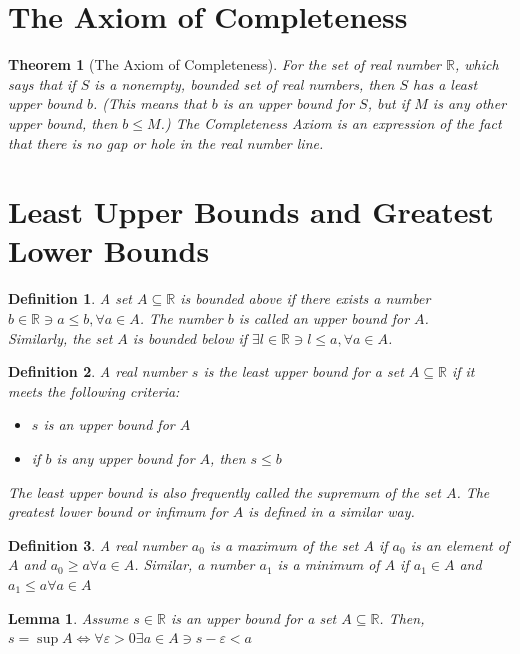 \documentclass[10pt]{report}
\newtheorem{thm2}{Theorem}[section]
\newtheorem{lem2}{Lemma}[section]
\newtheorem{def2}{Definition}[section]
\newcommand{\eps}{\varepsilon}
\begin{document}
\section{The Axiom of Completeness}
\begin{thm2}[The Axiom of Completeness]
For the set of real number $\mathbb{R}$, which says that if $S$ is a nonempty, bounded set of real numbers, then $S$ has a least upper bound $b$. (This means that $b$ is an upper bound for $S$, but if $M$ is any other upper bound, then $b\leq M$.) The Completeness Axiom is an expression of the fact that there is no gap or hole in the real number line.
\end{thm2}

\section{Least Upper Bounds and Greatest Lower Bounds}
\begin{def2}
A set $A\subseteq \mathbb{R}$ is bounded above if there exists a number $b\in \mathbb{R}\ni a\leq b,\forall a\in A$. The number $b$ is called an upper bound for $A$.\\
Similarly, the set $A$ is bounded below if $\exists l\in \mathbb{R}\ni l\leq a,\forall a\in A$. 
\end{def2}
\begin{def2}
A real number $s$ is the least upper bound for a set $A\subseteq \mathbb{R}$ if it meets the following criteria:
\begin{itemize}
\item[(1)] $s$ is an upper bound for $A$
\item[(2)] if $b$ is any upper bound for $A$, then $s\leq b$
\end{itemize}
The least upper bound is also frequently called the supremum of the set $A$. The greatest lower bound or infimum for $A$ is defined in a similar way.
\end{def2}
\begin{def2}
A real number $a_0$ is a maximum of the set $A$ if $a_0$ is an element of $A$ and $a_0\geq a\forall a\in A$. Similar, a number $a_1$ is a minimum of $A$ if $a_1 \in A$ and $a_1\leq a\forall a\in A$
\end{def2}
\begin{lem2}
Assume $s\in \mathbb{R}$ is an upper bound for a set $A\subseteq \mathbb{R}$. Then, $s=\sup A\iff \forall \eps > 0 \exists a\in A\ni s- \eps < a$
\end{lem2}
\end{document}
